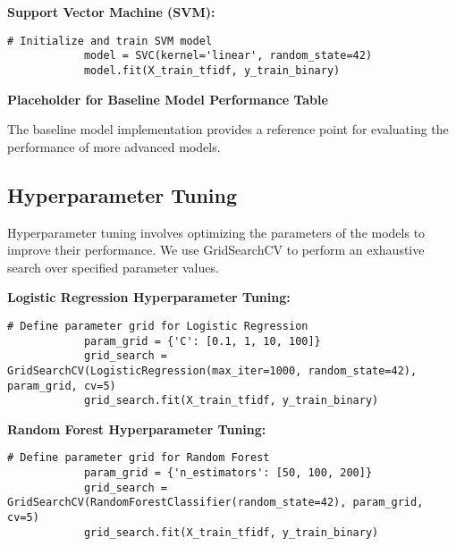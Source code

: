         \textbf{Support Vector Machine (SVM):}
        
        \vspace{0.5em}

        \begin{lstlisting}[caption={Train SVM model}, label={lst:svm}]
            # Initialize and train SVM model
            model = SVC(kernel='linear', random_state=42)
            model.fit(X_train_tfidf, y_train_binary)
        \end{lstlisting}

        \textbf{Placeholder for Baseline Model Performance Table}

        The baseline model implementation provides a reference point for evaluating the performance of more advanced models.
            
    \subsection{Hyperparameter Tuning}
    
        Hyperparameter tuning involves optimizing the parameters of the models to improve their performance. We use GridSearchCV to perform an exhaustive search over specified parameter values.

        \textbf{Logistic Regression Hyperparameter Tuning:}
        
        \vspace{0.5em}

        \begin{lstlisting}[caption={Parameter grid for Logistic Regression}, label={lst:param_grid_logistic}]
            # Define parameter grid for Logistic Regression
            param_grid = {'C': [0.1, 1, 10, 100]}
            grid_search = GridSearchCV(LogisticRegression(max_iter=1000, random_state=42), param_grid, cv=5)
            grid_search.fit(X_train_tfidf, y_train_binary)
        \end{lstlisting}

        \textbf{Random Forest Hyperparameter Tuning:}
        
        \vspace{0.5em}

        \begin{lstlisting}[caption={Parameter grid for Random Forest}, label={lst:param_grid_rf}]
            # Define parameter grid for Random Forest
            param_grid = {'n_estimators': [50, 100, 200]}
            grid_search = GridSearchCV(RandomForestClassifier(random_state=42), param_grid, cv=5)
            grid_search.fit(X_train_tfidf, y_train_binary)
        \end{lstlisting}

